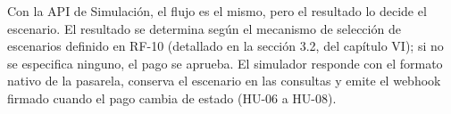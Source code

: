 Con la API de Simulación, el flujo es el mismo, pero el resultado lo decide el escenario. El resultado se determina según el mecanismo de selección de escenarios definido en RF-10 (detallado en la sección 3.2, del capítulo VI); si no se especifica ninguno, el pago se aprueba. El simulador responde con el formato nativo de la pasarela, conserva el escenario en las consultas y emite el webhook firmado cuando el pago cambia de estado (HU-06 a HU-08).
